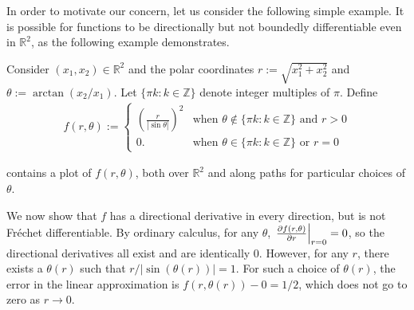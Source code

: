 In order to motivate our concern, let us consider the following simple example.
It is possible for functions to be directionally but not boundedly
differentiable even in $\mathbb{R}^2$, as the following example demonstrates.

\begin{ex}
%
Consider $(x_1, x_2) \in \mathbb{R}^2$ and the polar coordinates $r :=
\sqrt{x_1^2 + x_2^2}$ and $\theta := \arctan(x_2 / x_1)$.  Let $\{\pi k: k \in
\mathbb{Z} \}$ denote integer multiples of $\pi$.  Define
%
\begin{align*}
%
f(r, \theta) := \begin{cases}
    \left(\frac{r}{| \sin \theta |}\right)^2
        & \textrm{when } \theta \notin \{\pi k: k \in \mathbb{Z}\}
        \textrm{ and } r > 0 \\
    0. & \textrm{when } \theta \in \{\pi k: k \in \mathbb{Z}
        \} \textrm{ or }r = 0
%
\end{cases}
%
\end{align*}
%
\SimPathologicalRTwoFig{}

%
%
 contains a plot of $f(r, \theta)$, both over
$\mathbb{R}^2$ and along paths for particular choices of $\theta$.

We now show that $f$ has a directional derivative in every direction, but is not
Fr{\'e}chet differentiable.  By ordinary calculus, for any $\theta$,
$\left.\frac{\partial f(r, \theta)}{\partial r}\right\vert_{r=0} = 0$, so the directional
derivatives all exist and are identically $0$.  However, for any $r$, there
exists a $\theta(r)$ such that $r / |\sin(\theta(r))| = 1$.  For such a choice
of $\theta(r)$, the error in the linear approximation is $f(r, \theta(r)) - 0 =
1/2$, which does not go to zero as $r \rightarrow 0$.

\end{ex}


